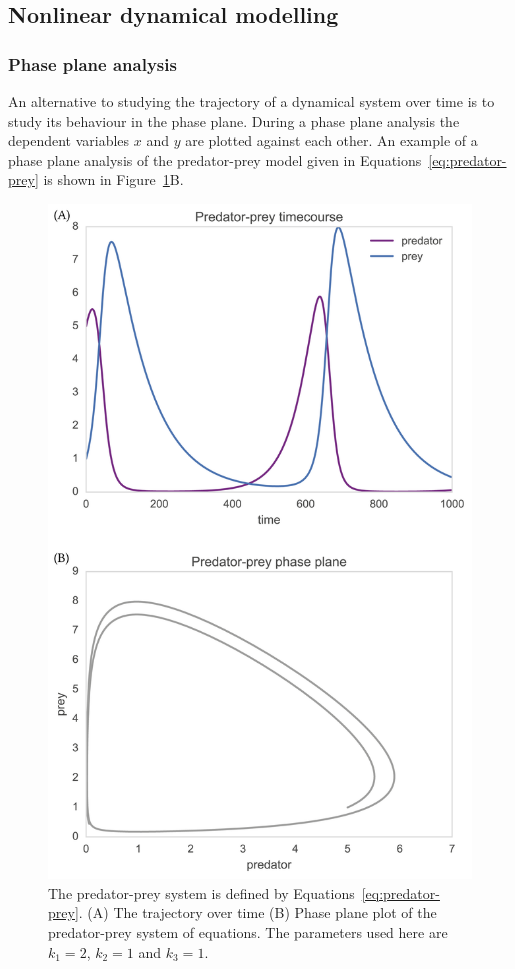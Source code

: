 \subsection{Nonlinear dynamical modelling}

\subsubsection{Phase plane analysis}
An alternative to studying the trajectory of a dynamical system over time is to study its behaviour in the phase plane. During a phase plane analysis the dependent variables $x$ and $y$ are plotted against each other. An example of a phase plane analysis of the predator-prey model given in Equations~\ref{eq:predator-prey} is shown in Figure~\ref{fig:pp_phase}B.

\begin{figure}[htb]
\centerfloat
    \includegraphics[scale=0.7]{../../chapters/chapterBackgr/images/phas_plane_example.png}
    \caption[Phase plane analysis]{The predator-prey system is defined by Equations~\ref{eq:predator-prey}. (A) The trajectory over time (B) Phase plane plot of the predator-prey system of equations. The parameters used here are $k_1=2$, $k_2=1$ and $k_3=1$.}
    \label{fig:pp_phase}
\end{figure}

